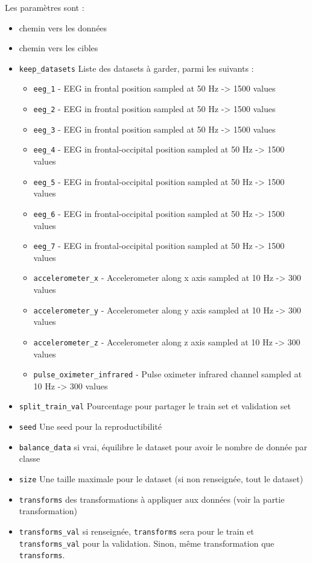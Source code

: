 \documentclass[11pt]{article}
\providecommand{\tightlist}{%
      \setlength{\itemsep}{0pt}\setlength{\parskip}{0pt}}
\begin{document}
    Les paramètres sont :

\begin{itemize}
\tightlist
\item
  chemin vers les données
\item
  chemin vers les cibles
\item
  \texttt{keep\_datasets} Liste des datasets à garder, parmi les
  suivants :

  \begin{itemize}
  \tightlist
  \item
    \texttt{eeg\_1} - EEG in frontal position sampled at 50 Hz
    -\textgreater{} 1500 values
  \item
    \texttt{eeg\_2} - EEG in frontal position sampled at 50 Hz
    -\textgreater{} 1500 values
  \item
    \texttt{eeg\_3} - EEG in frontal position sampled at 50 Hz
    -\textgreater{} 1500 values
  \item
    \texttt{eeg\_4} - EEG in frontal-occipital position sampled at 50 Hz
    -\textgreater{} 1500 values
  \item
    \texttt{eeg\_5} - EEG in frontal-occipital position sampled at 50 Hz
    -\textgreater{} 1500 values
  \item
    \texttt{eeg\_6} - EEG in frontal-occipital position sampled at 50 Hz
    -\textgreater{} 1500 values
  \item
    \texttt{eeg\_7} - EEG in frontal-occipital position sampled at 50 Hz
    -\textgreater{} 1500 values
  \item
    \texttt{accelerometer\_x} - Accelerometer along x axis sampled at 10
    Hz -\textgreater{} 300 values
  \item
    \texttt{accelerometer\_y} - Accelerometer along y axis sampled at 10
    Hz -\textgreater{} 300 values
  \item
    \texttt{accelerometer\_z} - Accelerometer along z axis sampled at 10
    Hz -\textgreater{} 300 values
  \item
    \texttt{pulse\_oximeter\_infrared} - Pulse oximeter infrared channel
    sampled at 10 Hz -\textgreater{} 300 values
  \end{itemize}
\item
  \texttt{split\_train\_val} Pourcentage pour partager le train set et
  validation set
\item
  \texttt{seed} Une seed pour la reproductibilité
\item
  \texttt{balance\_data} si vrai, équilibre le dataset pour avoir le
  nombre de donnée par classe
\item
  \texttt{size} Une taille maximale pour le dataset (si non renseignée,
  tout le dataset)
\item
  \texttt{transforms} des transformations à appliquer aux données (voir
  la partie transformation)
\item
  \texttt{transforms\_val} si renseignée, \texttt{transforms} sera pour
  le train et \texttt{transforms\_val} pour la validation. Sinon, même
  transformation que \texttt{transforms}.
\end{itemize}
\end{document}
